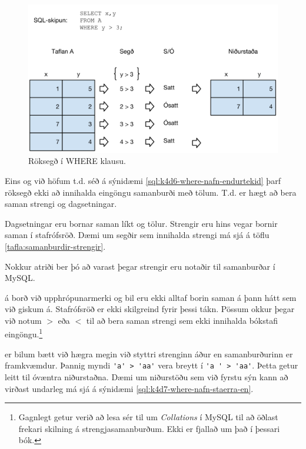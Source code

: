 \begin{figure}
\caption[Röksegð í WHERE klausu]{Röksegð í WHERE klausu.}
\label{mynd:roksegd}
\centering
\includegraphics[width=\linewidth]{myndir/roksegd}
\end{figure}

Eins og við höfum t.d. séð á sýnidæmi \ref{sql:k4d6-where-nafn-endurtekid} þarf röksegð ekki að innihalda eingöngu samanburði með tölum. T.d. er hægt að bera saman strengi og dagsetningar.

Dagsetningar eru bornar saman líkt og tölur. Strengir eru hins vegar bornir saman í stafrófsröð. Dæmi um segðir sem innihalda strengi má sjá á töflu \ref{tafla:samanburdir-strengir}.

Nokkur atriði ber þó að varast þegar strengir eru notaðir til samanburðar í MySQL.

 á borð við upphrópunarmerki og bil eru ekki alltaf borin saman á þann hátt sem við giskum á. Stafrófsröð er ekki skilgreind fyrir þessi tákn. Pössum okkur þegar við notum $>$ eða $<$ til að bera saman strengi sem ekki innihalda bókstafi eingöngu.\footnote{Gagnlegt getur verið að lesa sér til um \emph{Collations} í MySQL til að öðlast frekari skilning á strengjasamanburðum. Ekki er fjallað um það í þessari bók.}

 er bilum bætt við hægra megin við styttri strenginn áður en samanburðurinn er framkvæmdur. Þannig myndi \verb|'a' > 'aa'| vera breytt í \verb|'a ' > 'aa'|. Þetta getur leitt til óvæntra niðurstaðna. Dæmi um niðurstöðu sem við fyrstu sýn kann að virðast undarleg má sjá á sýnidæmi \ref{sql:k4d7-where-nafn-staerra-en}.

